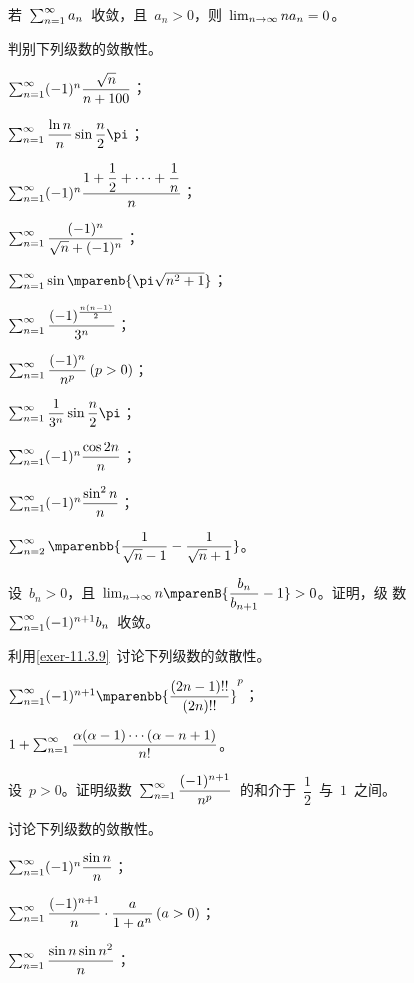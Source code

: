 \begin{exercise}
\begin{exlistcols}
  \item 若~$\sum_{n=1}^\infty a_n$~收敛，且~$a_n>0$，则~$\lim_{n\to\infty} na_n=0$。
\end{exlistcols}
\item 判别下列级数的敛散性。
\begin{exlistcols}
  \item $\sum_{n=1}^\infty(-1)^n\dfrac{\sqrt n}{n+100}$；
  \item $\sum_{n=1}^\sinf\dfrac{\ln n}n\sin\dfrac n2\pi$；
  \item $\sum_{n=1}^\infty(-1)^n\dfrac{1+\dfrac12+\dotsb+\dfrac1n}n$；
  \item $\sum_{n=1}^\infty\dfrac{(-1)^n}{\sqrt n+(-1)^n}$；
  \item $\sum_{n=1}^\sinf\sin\mparenb{\pi\sqrt{n^2+1}}$；
  \item $\sum_{n=1}^\infty\dfrac{(-1)^{\frac{n(n-1)}2}}{3^n}$；
  \item $\sum_{n=1}^\sinf\dfrac{(-1)^n}{n^p}\mcond{p>0}$；
  \item $\sum_{n=1}^\sinf\dfrac1{3^n}\sin\dfrac n2\pi$；
  \item $\sum_{n=1}^\infty(-1)^n\dfrac{\cos2n}n$；
  \item $\sum_{n=1}^\infty(-1)^n\dfrac{\sin^2n}n$；
  \item $\sum_{n=2}^\sinf\mparenbb{\dfrac1{\sqrt n-1}-\dfrac1{\sqrt n+1}}$。
\end{exlistcols}
\item\label{exer-11.3.9}设~$b_n>0$，且~$\lim_\ntoinf n\mparenB{\dfrac{b_n}{b_{n+1}}-1}>0$。证明，级
数~$\sum_{n=1}^\infty(-1)^{n+1}b_n$~收敛。
\item 利用\ref{exer-11.3.9}~讨论下列级数的敛散性。
\begin{exlistcols}
  \item $\sum_{n=1}^\sinf(-1)^{n+1}\mparenbb{\dfrac{(2n-1)!!}{(2n)!!}}^p$；
  \item $1+\sum_{n=1}^\infty\dfrac{\alpha(\alpha-1)\dotsm(\alpha-n+1)}{n!}$。
\end{exlistcols}
\item 设~$p>0$。证明级数~$\sum_{n=1}^\infty\dfrac{(-1)^{n+1}}{n^p}$~的和介于~$\dfrac12$~与~$1$~之间。
\item 讨论下列级数的敛散性。
\begin{exlistcols}
  \item $\sum_{n=1}^\infty(-1)^n\dfrac{\sin n}n$；
  \item $\sum_{n=1}^\sinf\dfrac{(-1)^{n+1}}n\cdot\dfrac a{1+a^n}\mcond{a>0}$；
  \item $\sum_{n=1}^\infty\dfrac{\sin n\sin n^2}n$；

\end{exlistcols}
\end{exercise}
